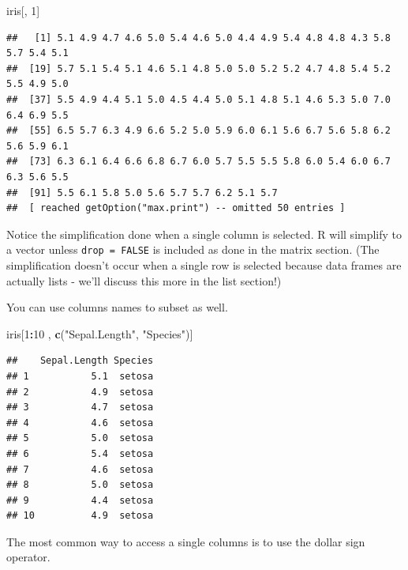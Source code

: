 \documentclass[
]{book}
\newenvironment{Shaded}{\begin{snugshade}}{\end{snugshade}}
\newcommand{\DecValTok}[1]{\textcolor[rgb]{0.00,0.00,0.81}{#1}}
\newcommand{\KeywordTok}[1]{\textcolor[rgb]{0.13,0.29,0.53}{\textbf{#1}}}
\newcommand{\NormalTok}[1]{#1}
\newcommand{\OperatorTok}[1]{\textcolor[rgb]{0.81,0.36,0.00}{\textbf{#1}}}
\newcommand{\StringTok}[1]{\textcolor[rgb]{0.31,0.60,0.02}{#1}}
\theoremstyle{definition}
\theoremstyle{definition}
\theoremstyle{definition}
\theoremstyle{remark}
\begin{document}
\begin{Shaded}
\begin{Highlighting}[]
\NormalTok{iris[, }\DecValTok{1}\NormalTok{]}
\end{Highlighting}
\end{Shaded}

\begin{verbatim}
##   [1] 5.1 4.9 4.7 4.6 5.0 5.4 4.6 5.0 4.4 4.9 5.4 4.8 4.8 4.3 5.8 5.7 5.4 5.1
##  [19] 5.7 5.1 5.4 5.1 4.6 5.1 4.8 5.0 5.0 5.2 5.2 4.7 4.8 5.4 5.2 5.5 4.9 5.0
##  [37] 5.5 4.9 4.4 5.1 5.0 4.5 4.4 5.0 5.1 4.8 5.1 4.6 5.3 5.0 7.0 6.4 6.9 5.5
##  [55] 6.5 5.7 6.3 4.9 6.6 5.2 5.0 5.9 6.0 6.1 5.6 6.7 5.6 5.8 6.2 5.6 5.9 6.1
##  [73] 6.3 6.1 6.4 6.6 6.8 6.7 6.0 5.7 5.5 5.5 5.8 6.0 5.4 6.0 6.7 6.3 5.6 5.5
##  [91] 5.5 6.1 5.8 5.0 5.6 5.7 5.7 6.2 5.1 5.7
##  [ reached getOption("max.print") -- omitted 50 entries ]
\end{verbatim}

Notice the simplification done when a single column is selected. R will simplify to a vector unless \texttt{drop\ =\ FALSE} is included as done in the matrix section. (The simplification doesn't occur when a single row is selected because data frames are actually lists - we'll discuss this more in the list section!)

You can use columns names to subset as well.

\begin{Shaded}
\begin{Highlighting}[]
\NormalTok{iris[}\DecValTok{1}\OperatorTok{:}\DecValTok{10}\NormalTok{ , }\KeywordTok{c}\NormalTok{(}\StringTok{"Sepal.Length"}\NormalTok{, }\StringTok{"Species"}\NormalTok{)]}
\end{Highlighting}
\end{Shaded}

\begin{verbatim}
##    Sepal.Length Species
## 1           5.1  setosa
## 2           4.9  setosa
## 3           4.7  setosa
## 4           4.6  setosa
## 5           5.0  setosa
## 6           5.4  setosa
## 7           4.6  setosa
## 8           5.0  setosa
## 9           4.4  setosa
## 10          4.9  setosa
\end{verbatim}

The most common way to access a single columns is to use the dollar sign operator.

\begin{Shaded}
\end{Shaded}
\end{document}
